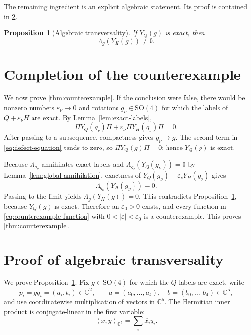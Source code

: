\documentclass[11pt,reqno]{amsart}
\newtheorem{proposition}[theorem]{Proposition}
\theoremstyle{remark}
\newcommand{\C}{\mathbb C}
\newcommand{\SO}{\mathrm{SO}}
\newcommand{\eps}{\varepsilon}
\newcommand{\ip}[2]{\left\langle #1,#2\right\rangle}
\newcommand{\abs}[1]{\left\lvert #1\right\rvert}
\begin{document}
The remaining ingredient is an explicit algebraic statement.  Its proof is
contained in \cref{app:transversality}.

\begin{proposition}[Algebraic transversality]\label{prop:algebraic-transversality}
If $Y_Q(g)$ is exact, then
\begin{equation}\label{eq:transversality}
 \Lambda_g(Y_H(g))\ne0.
\end{equation}
\end{proposition}

\section{Completion of the counterexample}\label{sec:completion}

We now prove \cref{thm:counterexample}.  If the conclusion were false, there
would be nonzero numbers $\eps_\nu\to0$ and rotations $g_\nu\in\SO(4)$ for
which the labels of $Q+\eps_\nu H$ are exact.  By
Lemma~\ref{lem:exact-labels},
\begin{equation}\label{eq:defect-equation}
 \Pi Y_Q(g_\nu)\Pi
 +\eps_\nu\Pi Y_H(g_\nu)\Pi=0.
\end{equation}
After passing to a subsequence, compactness gives $g_\nu\to g$.  The second
term in \eqref{eq:defect-equation} tends to zero, so
$\Pi Y_Q(g)\Pi=0$; hence $Y_Q(g)$ is exact.

Because $\Lambda_{g_\nu}$ annihilates exact labels and
$\Lambda_{g_\nu}(Y_Q(g_\nu))=0$ by
Lemma~\ref{lem:global-annihilation}, exactness of
$Y_Q(g_\nu)+\eps_\nu Y_H(g_\nu)$ gives
\[
 \Lambda_{g_\nu}(Y_H(g_\nu))=0.
\]
Passing to the limit yields $\Lambda_g(Y_H(g))=0$.  This contradicts
Proposition~\ref{prop:algebraic-transversality}, because $Y_Q(g)$ is exact.  Therefore
an $\eps_0>0$ exists, and every function in
\eqref{eq:counterexample-function} with $0<\abs\eps<\eps_0$ is a
counterexample.  This proves \cref{thm:counterexample}.

\appendix

\section{Proof of algebraic transversality}\label{app:transversality}

We prove Proposition~\ref{prop:algebraic-transversality}.  Fix $g\in\SO(4)$ for which the
$Q$-labels are exact, write
\[
p_i=gq_i=(a_i,b_i)\in\C^2,
\qquad
a=(a_0,\dots,a_4),\quad b=(b_0,\dots,b_4)\in\C^5,
\]
and use coordinatewise multiplication of vectors in $\C^5$.  The Hermitian
inner product is conjugate-linear in the first variable:
\[
\ip{x}{y}_{\C^5}=\sum_i\overline{x_i}y_i.
\]
\end{document}
